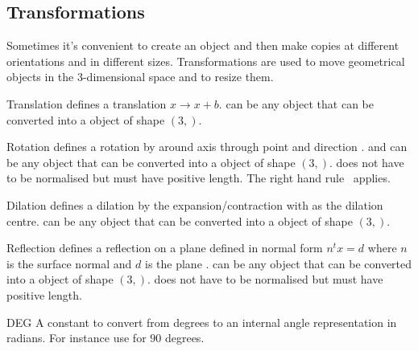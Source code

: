 \subsection{Transformations}

Sometimes it's convenient to create an object and then make copies at
different orientations and in different sizes.  Transformations are
used to move geometrical objects in the 3-dimensional space and to
resize them.

\begin{classdesc}{Translation}{}
defines a translation $x \to x+b$.  can be any object that can be converted 
into a \numpy object of shape $(3,)$.
\end{classdesc}
              
\begin{classdesc}{Rotation}{ }
defines a rotation by  around axis through point  and direction . 
 and  can be any object that can be converted 
into a \numpy object of shape $(3,)$.
 does not have to be normalised but must have positive length. The right hand rule~\cite{RIGHTHANDRULE}
applies.
\end{classdesc}


\begin{classdesc}{Dilation}{}
defines a dilation by the expansion/contraction  with 
 as the dilation centre.
 can be any object that can be converted 
into a \numpy object of shape $(3,)$.
\end{classdesc}

\begin{classdesc}{Reflection}{}
defines a reflection on a plane defined in normal form $n^t x = d$ 
where $n$ is the surface normal  and $d$ is the plane .
 can be any object that can be converted 
into a \numpy object of shape $(3,)$.
 does not have to be normalised but must have positive length. 
\end{classdesc}

\begin{datadesc}{DEG}
A constant to convert from degrees to an internal angle representation in radians. For instance use  for $90$ degrees.
\end{datadesc}

